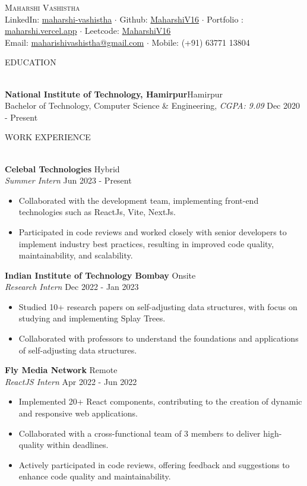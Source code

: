 \documentclass[a4paper]{article}
\newcommand{\bulletSep} { \vspace{2mm} }
\newcommand{\sectionSep} { \vspace{4mm} }
\newcommand{\lineunder} {
    \vspace*{-8pt} \\
    \hspace*{-15pt} \hrulefill \\
}
\newcommand{\header} [1] {
    {\hspace*{-18pt}\vspace*{6pt} {
        \large \scshape #1
    }}
    \vspace*{-6pt} \lineunder
    \vspace{1mm}
}
\newcommand{\educationItem}[5]{
    \textbf{#1}\hfill #2\\
    #3, \textit{#4} \hfill #5\\
}
\newcommand{\experienceItem}[5]{
    \textbf{#1} \hfill #2 \\
    \textit{#3} \hfill #4 \\
    \begin{itemize}
        #5
    \end{itemize}
}
\begin{document}

\begin{center}
    {\Huge \scshape {}\selectfont Maharshi Vashistha}\\
    \bulletSep
    LinkedIn: \href{https://www.linkedin.com/in/maharshi-vashistha/}{maharshi-vashistha} $\cdot$
    Github: \href{https://github.com/MaharshiV16}{MaharshiV16} $\cdot$
    Portfolio : \href{https://maharshi.vercel.app/}{maharshi.vercel.app} $\cdot$
    Leetcode: \href{https://leetcode.com/MaharshiV16/}{MaharshiV16} \\
    \bulletSep
    Email: \href {mailto:maharishivashistha@gmail.com}{maharishivashistha@gmail.com} $\cdot$ Mobile: (+91) 63771 13804\\
    \sectionSep
\end{center}

\vspace{-3mm}


\header{EDUCATION}

\educationItem{National Institute of Technology, Hamirpur}{Hamirpur}{Bachelor of Technology, Computer Science \& Engineering}{CGPA: 9.09}{Dec 2020 - Present}

\sectionSep


\header{WORK EXPERIENCE}

\experienceItem{Celebal Technologies}{Hybrid}{Summer Intern}{Jun 2023 - Present}{
     \item Collaborated with the development team, implementing front-end technologies such as ReactJs, Vite, NextJs.
     \item Participated in code reviews and worked closely with senior developers to implement industry best practices, resulting in improved code quality, maintainability, and scalability.
}
\bulletSep

\experienceItem{Indian Institute of Technology Bombay}{Onsite}{Research Intern}{Dec 2022 - Jan 2023}{
     \item Studied 10+ research papers on self-adjusting data structures, with focus on studying and implementing Splay Trees.
     \item Collaborated with professors to understand the foundations and applications of self-adjusting data structures.
}
\bulletSep

\experienceItem{Fly Media Network}{Remote}{ReactJS Intern}{Apr 2022 - Jun 2022}{
     \item Implemented 20+ React components, contributing to the creation of dynamic and responsive web applications.
     \item Collaborated with a cross-functional team of 3 members to deliver high-quality within deadlines.
    \item Actively participated in code reviews, offering feedback and suggestions to enhance code quality and maintainability.
}
\bulletSep
\end{document}

